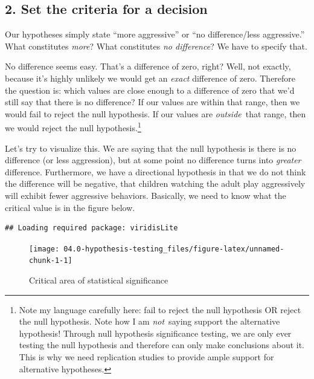 \documentclass[
]{book}
\begin{document}
\hypertarget{set-the-criteria-for-a-decision}{%
\subsection{2. Set the criteria for a decision}\label{set-the-criteria-for-a-decision}}

Our hypotheses simply state ``more aggressive'' or ``no difference/less aggressive.'' What constitutes \emph{more}? What constitutes \emph{no difference}? We have to specify that.

No difference seems easy. That's a difference of zero, right? Well, not exactly, because it's highly unlikely we would get an \emph{exact} difference of zero. Therefore the question is: which values are close enough to a difference of zero that we'd still say that there is no difference? If our values are within that range, then we would fail to reject the null hypothesis. If our values are \emph{outside}~that range, then we would reject the null hypothesis.\footnote{Note my language carefully here: fail to reject the null hypothesis OR reject the null hypothesis. Note how I am \emph{not}~saying support the alternative hypothesis! Through null hypothesis significance testing, we are only ever testing the null hypothesis and therefore can only make conclusions about it. This is why we need replication studies to provide ample support for alternative hypotheses.}

Let's try to visualize this. We are saying that the null hypothesis is there is no difference (or less aggression), but at some point no difference turns into \emph{greater} difference. Furthermore, we have a directional hypothesis in that we do not think the difference will be negative, that children watching the adult play aggressively will exhibit fewer aggressive behaviors. Basically, we need to know what the critical value is in the figure below.

\begin{verbatim}
## Loading required package: viridisLite
\end{verbatim}

\begin{figure}

{\centering \texttt{[image: 04.0-hypothesis-testing\_files/figure-latex/unnamed-chunk-1-1]} 

}

\caption{Critical area of statistical significance}\label{fig:unnamed-chunk-1}
\end{figure}
\end{document}
